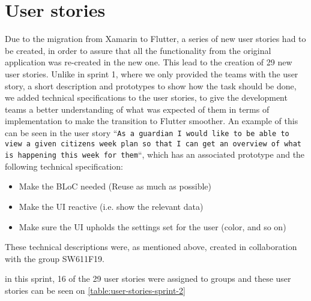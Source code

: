 \section{User stories}
Due to the migration from Xamarin to Flutter, a series of new user stories had to be created, in order to assure that all the functionality from the original application was re-created in the new one.
This lead to the creation of 29 new user stories.
Unlike in sprint 1, where we only provided the teams with the user story, a short description and prototypes to show how the task should be done, we added technical specifications to the user stories, to give the development teams a better understanding of what was expected of them in terms of implementation to make the transition to Flutter smoother.
An example of this can be seen in the user story ``\texttt{As a guardian I would like to be able to view a given citizens week plan so that I can get an overview of what is happening this week for them}``, which has an associated prototype and the following technical specification:

\begin{itemize}
    \item Make the BLoC needed (Reuse as much as possible)
    \item Make the UI reactive (i.e. show the relevant data)
    \item Make sure the UI upholds the settings set for the user (color, and so on)
\end{itemize}
These technical descriptions were, as mentioned above, created in collaboration with the group SW611F19.

\noindent in this sprint, 16 of the 29 user stories were assigned to groups and these user stories can be seen on \autoref{table:user-stories-sprint-2}

